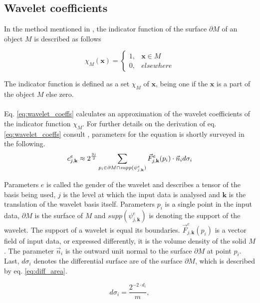 \subsection{Wavelet coefficients}
In the method mentioned in \cite{Manson2008}, the indicator function of the surface $\partial M$ of an object $M$ is described as follows

\begin{equation}
	\chi_M(\textbf{x}) = 
	\begin{cases}
	1, & \textbf{x} \in M\\
	0, & elsewhere
	\end{cases} 
	\label{eq:indicator_fnc}
\end{equation}

\noindent The indicator function is defined as a set $\chi_M$ of $\textbf{x}$, being one if the $\textbf{x}$ is a part of the object $M$ else zero.\\
\\
Eq. \ref{eq:wavelet_coeffs} calculates an approximation of the wavelet coefficients of the indicator function $\chi_M$. For further details on the derivation of eq. \ref{eq:wavelet_coeffs} consult \cite{Manson2008}, parameters for the equation is shortly surveyed in the following.\\

\begin{equation}
	c^e_{j,\textbf{k}} \approx 2^{3j \over 2} \sum_{p_i \in \partial M \cap \textit{supp}(\psi^e_{j,\textbf{k}})} \vec{F}^e_{j,\textbf{k}} (p_i) \cdot \vec{n}_i d \sigma_i 
	\label{eq:wavelet_coeffs}
\end{equation}

\noindent Parameters $e$ is called the gender of the wavelet and describes a tensor of the basis being used, $j$ is the level at which the input data is analysed and $\textbf{k}$ is the translation of the wavelet basis itself. Parameters $p_i$ is a single point in the input data, $\partial M$ is the surface of $M$ and $\textit{supp}(\psi^e_{j,\textbf{k}})$ is denoting the support of the wavelet. The support of a wavelet is equal its boundaries. $\vec{F}^e_{j,\textbf{k}} (p_i)$ is a vector field of input data, or expressed differently, it is the volume density of the solid $M$. The parameter $\vec{n}_i$ is the outward unit normal to the surface $\partial M$ at point $p_i$. Last, $d \sigma_i$ denotes the differential surface are of the surface $\partial M$, which is described by eq. \ref{eq:diff_area}.

\begin{equation}
	d \sigma_i = \frac{2^{-2 \cdot d_i}}{m},
	\label{eq:diff_area}
\end{equation}


